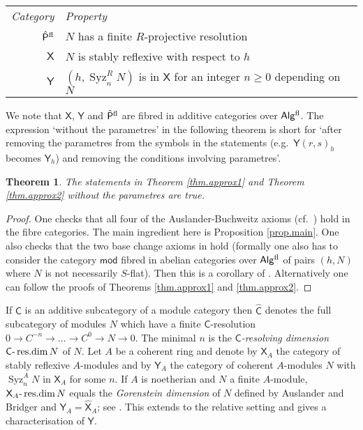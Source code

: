\documentclass[a4paper,10pt]{amsart}
\theoremstyle{plain}
\newtheorem{thm}[xx]{Theorem}%
\theoremstyle{definition}
\theoremstyle{remark}
\numberwithin{equation}{xx}
\DeclareMathOperator{\Resdim}{res{.}dim}
\DeclareMathOperator{\Syz}{Syz}
\newcommand{\ra}{\rightarrow}
\newcommand{\Algf}{\cat{Alg}{}^{\textnormal{fl}}}
\newcommand{\Pf}{\hat{\cat{P}}{}^{\textnormal{fl}}}
\newcommand{\resdim}[2]{{#1}\textnormal{-}\Resdim{#2}}
\renewcommand{\geq}{\geqslant}
\newcommand{\cat}[1]{\mathsf{{#1}}}
\newcommand{\syz}[2]{{\Syz}_{#2}^{#1}}
\begin{document}
\begin{center}
\setlength{\extrarowheight}{2,5pt}
\begin{tabularx}{\linewidth}[t]{ r | X }
\textit{Category} & \textit{Property}
\\[0.5ex]
\(\Pf\) & \(N\) has a finite \(R\)-projective resolution \\
\(\cat{X}\) & \(N\) is stably reflexive with respect to \(h\) \\
\(\cat{Y}\) & \((h,\syz{R}{n} N)\) is in \(\cat{X}\) for an integer \(n\geq 0\) depending on \(N\) 
\end{tabularx}
\end{center}
We note that \(\cat{X}\), \(\cat{Y}\) and \(\Pf\) are fibred in additive categories over \(\Algf\). The expression `without the parametres' in the following theorem is short for `after removing the parametres from the symbols in the statements (e.g.\ \(\cat{Y}(r,s)_{h}\) becomes \(\cat{Y}_{h}\)) and removing the conditions involving parametres'.
\begin{thm}\label{thm.approx3}
The statements in \textup{Theorem \ref{thm.approx1}} and \textup{Theorem \ref{thm.approx2}} without the parametres are true\textup{.}
\end{thm}
\begin{proof}
One checks that all four of the Auslander-Buchweitz axioms (cf.\ \cite{ile:12a}) hold in the fibre categories. The main ingredient here is Proposition \ref{prop.main}. One also checks that the two base change axioms in \cite{ile:12a} hold (formally one also has to consider the category \(\cat{mod}\) fibred in abelian categories over \(\Algf\) of pairs \((h,N)\) where \(N\) is not necessarily \(S\)-flat). Then this is a corollary of \cite[4.4 and 4.5]{ile:12a}. Alternatively one can follow the proofs of Theorems \ref{thm.approx1} and \ref{thm.approx2}.
\end{proof}
If \(\cat{C}\) is an additive subcategory of a module category then \(\hat{\cat{C}}\) denotes the full subcategory of modules \(N\) which have a finite \(\cat{C}\)-resolution \(0\ra C^{-n}\ra\dots\ra C^{0}\ra N\ra 0\). The minimal \(n\) is the \emph{\(\cat{C}\)-resolving dimension} \(\resdim{\cat{C}}{N}\) of \(N\). Let \(A\) be a coherent ring and denote by \(\cat{X}_{A}\) the category of stably reflexive \(A\)-modules and by \(\cat{Y}_{A}\) the category of coherent \(A\)-modules \(N\) with \(\syz{A}{n}N\) in \(\cat{X}_{A}\) for some \(n\). If \(A\) is noetherian and \(N\) a finite \(A\)-module, \(\resdim{\cat{X}_{A}}{N}\) equals the \emph{Gorenstein dimension} of \(N\) defined by Auslander and Bridger and \(\cat{Y}_{A}=\hat{\cat{X}}_{A}\); see \cite[3.13]{aus/bri:69}. This extends to the relative setting and gives a characterisation of \(\cat{Y}\).
\end{document}
